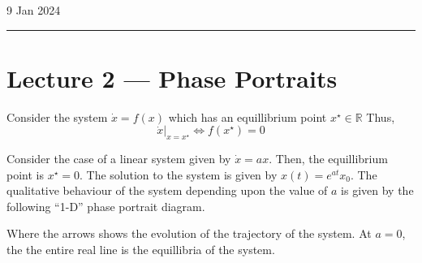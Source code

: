 \hfill\small{9 Jan 2024}
\vspace{0.5em}
\hrule
\vspace{-0.5em}
\section{Lecture 2 --- Phase Portraits}

Consider the system \(\dot{x} = f(x) \) which has an equillibrium point \(x^{\star} \in \mathbb{R}\)
Thus,
\[
    \left . \dot{x}  \right |_{x=x^{\star}} \iff f(x^{\star}) = 0
\]  
\begin{example}
    Consider the case of a linear system given by \(\dot{x} = ax\).
     Then, the equillibrium point is \(x^{\star} = 0\). The solution to the system
     is given by \(x(t) = e^{at} x_0\). The qualitative behaviour of the system 
     depending upon the value of \(a\) is given by the following ``1-D'' phase portrait diagram.

     \begin{center}

    \end{center}
    Where the arrows shows the evolution of the trajectory of the system. At \(a = 0\), the
    the entire real line is the equillibria of the system.
\end{example}

